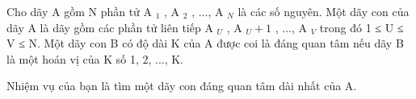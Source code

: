 Cho dãy A gồm N phần tử A   $_    1   $   , A   $_    2   $   , ..., A   $_    N   $   là các số nguyên. Một dãy con của dãy A là dãy gồm các phần tử liên tiếp A   $_    U   $   , A   $_    U+1   $   , ...,   A   $_    V   $   trong đó 1 ≤ U ≤ V ≤ N. Một dãy con B có độ dài K của A được coi là đáng quan tâm nếu dãy B là một hoán vị của K số 1, 2, ..., K.  

   Nhiệm vụ của bạn là tìm một dãy con đáng quan tâm dài nhất của A.